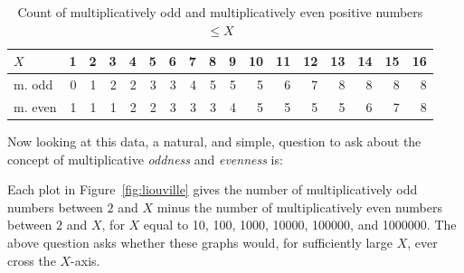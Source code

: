 \documentclass[openany]{book}
\theoremstyle{plain}
\theoremstyle{definition}
\begin{document}
 \begin{table}[H] \caption{Count of multiplicatively odd and
    multiplicatively even positive numbers $\le X$\label{tab:evenodddata}}
\vspace{1ex}
\centering
 {\small
\begin{tabular}{|l|r|r|r|r|r|r|r|r|r|r|r|r|r|r|r|r|}
\hline
$X$ & 1 & 2 & 3 & 4 & 5  & 6 & 7 & 8 & 9 & 10 & 11 & 12 & 13 & 14 & 15 & 16  \\ \hline\hline
m. odd & 0 & 1 & 2 & 2 & 3  & 3 & 4 & 5 & 5 & 5 & 6 & 7 & 8 & 8 & 8 & 8 \\ \hline
m. even & 1 & 1 & 1 & 2 & 2  & 3 & 3 & 3 & 4 & 5 & 5 & 5 & 5 & 6 & 7 & 8 \\ \hline
\end{tabular}}
\end{table}


   Now looking at this data, a natural, and simple, question to ask about the concept of multiplicative {\em oddness} and {\em evenness} is:


   Each plot in Figure~\ref{fig:liouville} gives the number of
   multiplicatively odd numbers between $2$ and $X$ minus the number
   of multiplicatively even numbers between $2$ and $X$, for $X$ equal
   to 10, 100, 1000, 10000, 100000, and 1000000. The above question
   asks whether these graphs would, for sufficiently large $X$, ever
   cross the $X$-axis.
\end{document}
